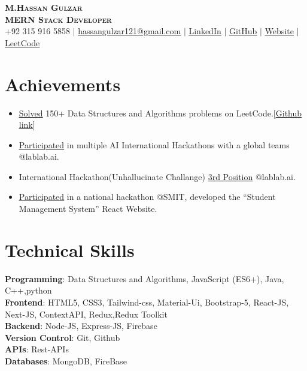 \documentclass[letterpaper,11pt]{article}
\newcommand{\resumeItem}[1]{
  \item\small{
    {#1 \vspace{-2pt}}
  }
}
\newcommand{\resumeItemListStart}{\begin{itemize}}
\newcommand{\resumeItemListEnd}{\end{itemize}\vspace{-5pt}}
\begin{document}
\begin{center}
    \textbf{\Huge \scshape M.Hassan Gulzar} \\ \vspace{1pt}
    \textbf{\small \scshape MERN Stack Developer} \\ \vspace{5pt}
  \small +92 315 916 5858 $|$
  \href{mailto:hassangulzar121@gmail.com}{hassangulzar121@gmail.com}  $|$
  \href{https://www.linkedin.com/in/hassan-gulzar-256292267/}{\underline{LinkedIn}} $|$
  \href{https://github.com/hassangulzar1}{\underline{GitHub}} $|$
  \href{https://hassan-gulzar.vercel.app/}{\underline{Website}} $|$
  \href{https://leetcode.com/M_HassanGulzar/}{\underline{LeetCode}}
\end{center}

\section{Achievements}
\resumeItemListStart
\resumeItem{{\href{https://leetcode.com/M_HassanGulzar/}{\underline{Solved}}} 150+ Data Structures and Algorithms problems on LeetCode.[{\href{https://github.com/hassangulzar1/Learning-DSA}{\underline{Github link}}}]}
\resumeItem{{\href{https://lablab.ai/u/@hassangulzar1926}{\underline{Participated}}} in multiple AI International Hackathons with a global teams @lablab.ai.}
\resumeItem{International Hackathon(Unhallucinate Challange) {\href{https://www.linkedin.com/posts/hassan-gulzar-256292267_hackathon-hackathonwinner-startup-activity-7176665274249560064-KLsP?utm_source=share&utm_medium=member_desktop}{\underline{3rd Position}}} @lablab.ai.}
\resumeItem{{\href{https://github.com/hassangulzar1/student-managment-system}{\underline{Participated}}} in a national hackathon @SMIT, developed the “Student Management System” React Website.}

\resumeItemListEnd

\section{Technical Skills}
\begin{itemize}[leftmargin=0.15in, label={}]
  \small{\item{
        \textbf{Programming}{: Data Structures and Algorithms, JavaScript (ES6+), Java, C++,python} \\
        \textbf{Frontend}{: HTML5, CSS3, Tailwind-css, Material-Ui, Bootstrap-5, React-JS, Next-JS,   ContextAPI, Redux,Redux Toolkit} \\
        \textbf{Backend}{: Node-JS, Express-JS, Firebase} \\
        \textbf{Version Control}{: Git, Github} \\
        \textbf{APIs}{: Rest-APIs} \\
        \textbf{Databases}{: MongoDB, FireBase}\\
        }}
\end{itemize}
%
\end{document}

